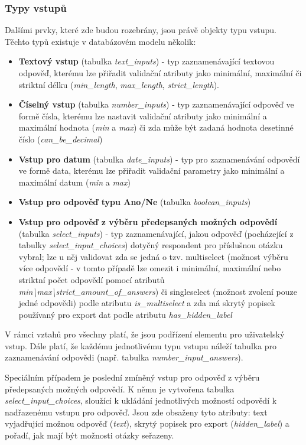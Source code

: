 	\subsubsection{Typy vstupů}
	\label{sec:form_inputs_types}
	Dalšími prvky, které zde budou rozebrány, jsou právě objekty typu vstupu. Těchto typů existuje v databázovém modelu několik:
	
	\begin{itemize}
		\item \textbf{Textový vstup} (tabulka \textit{text\_inputs}) - typ zaznamenávající textovou odpověď, kterému lze přiřadit validační atributy jako minimální, maximální či striktní délku (\textit{min\_length}, \textit{max\_length}, \textit{strict\_length}).
		\item \textbf{Číselný vstup} (tabulka \textit{number\_inputs}) - typ zaznamenávající odpověď ve formě čísla, kterému lze nastavit validační atributy jako minimální a maximální hodnota (\textit{min} a \textit{max}) či zda může být zadaná hodnota desetinné číslo (\textit{can\_be\_decimal})
		\item \textbf{Vstup pro datum} (tabulka \textit{date\_inputs}) - typ pro zaznamenávání odpovědí ve formě data, kterému lze přiřadit validační parametry jako minimální a maximální datum (\textit{min} a \textit{max})
		\item \textbf{Vstup pro odpověď typu Ano/Ne} (tabulka \textit{boolean\_inputs})
		\item \textbf{Vstup pro odpověď z výběru předepsaných možných odpovědí} (tabulka \textit{select\_inputs}) - typ zaznamenávající, jakou odpověď (pocházející z tabulky \textit{select\_input\_choices}) dotyčný respondent pro příslušnou otázku vybral; lze u něj validovat zda se jedná o tzv. multiselect (možnost výběru více odpovědí - v tomto případě lze omezit i minimální, maximální nebo striktní počet odpovědí pomocí atributů \textit{min\textbackslash max\textbackslash strict\_amount\_of\_answers}) či singleselect (možnost zvolení pouze jedné odpovědi) podle atributu \textit{is\_multiselect} a zda má skrytý popisek používaný pro export dat podle atributu \textit{has\_hidden\_label}
	\end{itemize}
	
	V rámci vztahů pro všechny platí, že jsou podřízení elementu pro uživatelský vstup. Dále platí, že každému jednotlivému typu vstupu náleží tabulka pro zaznamenávání odpovědi (např. tabulka \textit{number\_input\_answers}).
	
	Speciálním případem je poslední zmíněný vstup pro odpověď z výběru předepsaných možných odpovědí. K němu je vytvořena tabulka \textit{select\_input\_choices}, sloužící k ukládání jednotlivých možností odpovědí k nadřazenému vstupu pro odpověď. Jsou zde obsaženy tyto atributy: text vyjadřující možnou odpověď (\textit{text}), skrytý popisek pro export (\textit{hidden\_label}) a pořadí, jak mají být možnosti otázky seřazeny.
	
